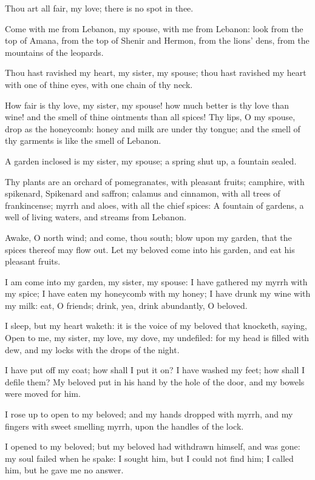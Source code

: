 \Verse Thou art all fair, my love; there is no spot in thee.

\Verse Come with me from Lebanon, my spouse, with me from Lebanon: look from the top of Amana, from the top of Shenir and Hermon, from the lions' dens, from the mountains of the leopards.

\Verse Thou hast ravished my heart, my sister, my spouse; thou hast ravished my heart with one of thine eyes, with one chain of thy neck.

\Verse How fair is thy love, my sister, my spouse! how much better is thy love than wine! and the smell of thine ointments than all spices!  \Verse Thy lips, O my spouse, drop as the honeycomb: honey and milk are under thy tongue; and the smell of thy garments is like the smell of Lebanon.

\Verse A garden inclosed is my sister, my spouse; a spring shut up, a fountain sealed.

\Verse Thy plants are an orchard of pomegranates, with pleasant fruits; camphire, with spikenard, \Verse Spikenard and saffron; calamus and cinnamon, with all trees of frankincense; myrrh and aloes, with all the chief spices: \Verse A fountain of gardens, a well of living waters, and streams from Lebanon.

\Verse Awake, O north wind; and come, thou south; blow upon my garden, that the spices thereof may flow out. Let my beloved come into his garden, and eat his pleasant fruits.


\Chapter
\Verse I am come into my garden, my sister, my spouse: I have gathered my myrrh with my spice; I have eaten my honeycomb with my honey; I have drunk my wine with my milk: eat, O friends; drink, yea, drink abundantly, O beloved.

\Verse I sleep, but my heart waketh: it is the voice of my beloved that knocketh, saying, Open to me, my sister, my love, my dove, my undefiled: for my head is filled with dew, and my locks with the drops of the night.

\Verse I have put off my coat; how shall I put it on? I have washed my feet; how shall I defile them?  \Verse My beloved put in his hand by the hole of the door, and my bowels were moved for him.

\Verse I rose up to open to my beloved; and my hands dropped with myrrh, and my fingers with sweet smelling myrrh, upon the handles of the lock.

\Verse I opened to my beloved; but my beloved had withdrawn himself, and was gone: my soul failed when he spake: I sought him, but I could not find him; I called him, but he gave me no answer.

